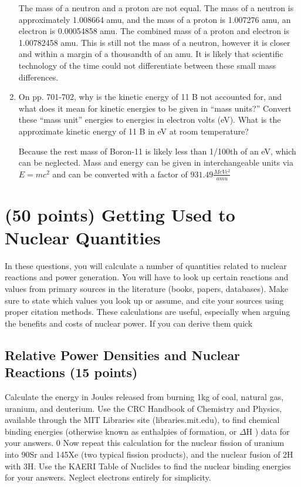 \documentclass{article}
\begin{document}
\begin{enumerate}
    The mass of a neutron and a proton are not equal. The mass of a neutron is approximately 1.008664 amu, and the mass of a proton is 1.007276 amu, an electron is 0.00054858 amu.
    The combined mass of a proton and electron is 1.00782458 amu. This is still not the mass of a neutron, however it is closer and within a margin of a thousandth of an amu. It is likely that scientific technology of the time could not differentiate between these small mass differences.   
    \item On pp. 701-702, why is the kinetic energy of 11 B not accounted for, and what does it mean for kinetic
energies to be given in “mass units?” Convert these “mass unit” energies to energies in electron volts
(eV). What is the approximate kinetic energy of 11 B in eV at room temperature?

    Because the rest mass of Boron-11 is likely less than 1/100th of an eV, which can be neglected.
    Mass and energy can be given in interchangeable units via $E=mc^2$ and can be converted with a factor of $931.49\frac{MeVc^2}{amu}$
\end{enumerate}


\section{(50 points) Getting Used to Nuclear Quantities}
In these questions, you will calculate a number of quantities related to nuclear reactions and power generation.
You will have to look up certain reactions and values from primary sources in the literature (books, papers,
databases). Make sure to state which values you look up or assume, and cite your sources using proper
citation methods.
These calculations are useful, especially when arguing the benefits and costs of nuclear power. If you can
derive them quick
\subsection{Relative Power Densities and Nuclear Reactions (15 points)}
Calculate the energy in Joules released from burning 1kg of coal, natural gas, uranium, and deuterium. Use
the CRC Handbook of Chemistry and Physics, available through the MIT Libraries site (libraries.mit.edu), to
find chemical binding energies (otherwise known as enthalpies of formation, or $\Delta$H ) data for your answers. 0
Now repeat this calculation for the nuclear fission of uranium into 90Sr and 145Xe (two typical fission
products), and the nuclear fusion of 2H with 3H. Use the KAERI Table of Nuclides to find the nuclear
binding energies for your answers. Neglect electrons entirely for simplicity.
\end{document}
